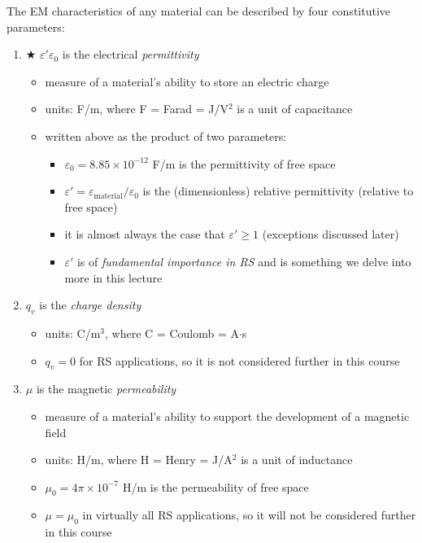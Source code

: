 \documentclass[11pt, oneside]{article}
\begin{document}
The EM characteristics of any material can be described by four constitutive parameters:
\begin{enumerate}
	\item $\bigstar$ $\varepsilon'\varepsilon_0$ is the electrical \emph{permittivity}
	\begin{itemize}
		\item measure of a material's ability to store an electric charge
		\item units: F/m, where F = Farad = J/V$^2$ is a unit of capacitance
		\item written above as the product of two parameters:
		\begin{itemize}
			\item $\varepsilon_0 = 8.85\times10^{-12}$ F/m is the permittivity of free space
			\item $\varepsilon' = \varepsilon_\mathrm{material}/\varepsilon_0$ is the (dimensionless) relative permittivity (relative to free space)
			\item it is almost always the case that $\varepsilon' \ge 1$ (exceptions discussed later)
			\item $\varepsilon'$ is of \emph{fundamental importance in RS} and is something we delve into more in this lecture
		\end{itemize}
	\end{itemize}
	\item $q_v$ is the \emph{charge density}
	\begin{itemize}
		\item units: C/m$^3$, where C = Coulomb = A$\cdot$s
		\item $q_v = 0$ for RS applications, so it is not considered further in this course
	\end{itemize}
	\item $\mu$ is the magnetic \emph{permeability}
	\begin{itemize}
		\item measure of a material's ability to support the development of a magnetic field
		\item units: H/m, where H = Henry = J/A$^2$ is a unit of inductance
		\item $\mu_0 = 4\pi\times10^{-7}$ H/m is the permeability of free space
		\item $\mu = \mu_0$ in virtually all RS applications, so it will not be considered further in this course

\end{itemize}
\end{enumerate}
\end{document}
